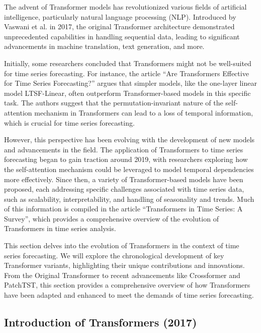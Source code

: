The advent of Transformer models has revolutionized various fields of artificial intelligence, particularly natural language processing (NLP). Introduced by Vaswani et al. in 2017\cite{vaswani2023attention}, the original Transformer architecture demonstrated unprecedented capabilities in handling sequential data, leading to significant advancements in machine translation, text generation, and more. 

Initially, some researchers concluded that Transformers might not be well-suited for time series forecasting. For instance, the article “Are Transformers Effective for Time Series Forecasting?”\cite{zeng2022transformerseffectivetimeseries} argues that simpler models, like the one-layer linear model LTSF-Linear, often outperform Transformer-based models in this specific task. The authors suggest that the permutation-invariant nature of the self-attention mechanism in Transformers can lead to a loss of temporal information, which is crucial for time series forecasting.

However, this perspective has been evolving with the development of new models and advancements in the field. The application of Transformers to time series forecasting began to gain traction around 2019, with researchers exploring how the self-attention mechanism could be leveraged to model temporal dependencies more effectively. Since then, a variety of Transformer-based models have been proposed, each addressing specific challenges associated with time series data, such as scalability, interpretability, and handling of seasonality and trends. Much of this information is compiled in the article “Transformers in Time Series: A Survey”\cite{wen2023transformerstimeseriessurvey}, which provides a comprehensive overview of the evolution of Transformers in time series analysis.

This section delves into the evolution of Transformers in the context of time series forecasting. We will explore the chronological development of key Transformer variants, highlighting their unique contributions and innovations. From the Original Transformer to recent advancements like Crossformer and PatchTST, this section provides a comprehensive overview of how Transformers have been adapted and enhanced to meet the demands of time series forecasting.

\subsection{Introduction of Transformers (2017)}


